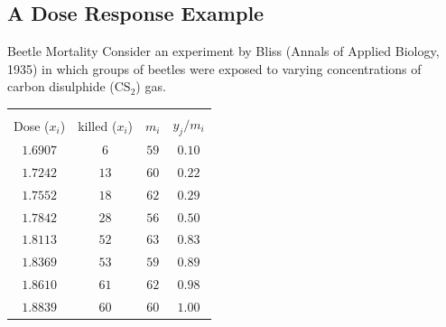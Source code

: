 \documentclass[oneside]{book}\usepackage[]{graphicx}\usepackage[svgnames]{xcolor}
\begin{document}
\subsection*{A Dose Response Example}
\begin{Example}{Beetle Mortality}
    Consider an experiment by Bliss (Annals of Applied Biology, 1935) in which groups of
    beetles were exposed to varying concentrations of carbon disulphide ($\text{CS}_2$) gas.
    \begin{center}
        \begin{NiceTabular}{cccc}
            \toprule
            & & \\
            Dose ($ x_i $) & killed ($ x_i $) & $ m_i $ & $ y_j/m_i $\\
            \midrule
            $ 1.6907 $ & $ 6 $ & $ 59 $ & $ 0.10 $\\
            $ 1.7242 $ & $ 13 $ & $ 60 $ & $ 0.22 $\\
            $ 1.7552 $ & $ 18 $ & $ 62 $ & $ 0.29 $\\
            $1.7842$ & $28$ & $56$ & $0.50$\\
            $1.8113$ & $52$ & $63$ & $0.83$\\
            $1.8369$ & $53$ & $59$ & $0.89$\\
            $1.8610$ & $61$ & $62$ & $0.98$\\
            $1.8839$ & $60$ & $60$ & $1.00$\\
            \bottomrule
        \end{NiceTabular}
    \end{center}
\end{Example}
\end{document}
